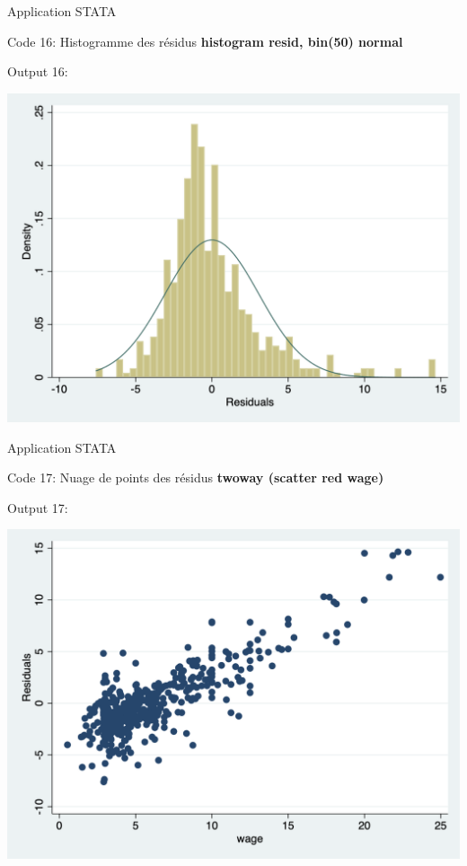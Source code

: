 \documentclass{beamer}
\begin{document}
\begin{frame}{Application STATA}

\begin{block}{Code 16: Histogramme des résidus}
\textbf{histogram resid, bin(50) normal}
\end{block}

\begin{block}{Output 16:}
\begin{center}
\includegraphics[scale=.3]{resid.png}
\end{center}
\end{block}

\end{frame}



\begin{frame}{Application STATA}

\begin{block}{Code 17: Nuage de points des résidus}
\textbf{twoway (scatter red wage)}
\end{block}

\begin{block}{Output 17:}
\begin{center}
\includegraphics[scale=.3]{scatter_resid.png}
\end{center}
\end{block}

\end{frame}
\end{document}
